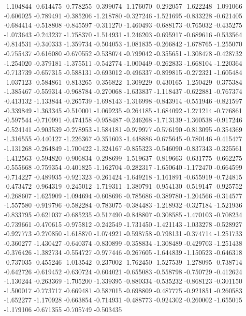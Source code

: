 -1.104844
-0.614475
-0.778255
-0.399074
-1.176070
-0.292057
-1.622248
-1.091066
-0.606025
-0.789491
-0.385206
-1.218780
-0.327246
-1.521695
-0.833228
-0.621405
-0.684414
-0.518808
-0.845597
-0.311270
-1.460493
-0.688173
-0.765032
-0.435275
-1.073643
-0.243237
-1.758370
-1.514931
-1.246203
-0.695917
-0.689616
-0.533564
-0.814531
-0.340333
-1.359734
-0.504053
-1.081835
-0.266842
-1.678765
-1.255070
-0.755437
-0.616080
-0.670552
-0.538074
-0.799042
-0.355651
-1.308478
-0.428732
-1.254020
-0.379181
-1.375511
-0.542774
-1.000449
-0.262833
-1.668104
-1.220364
-0.713739
-0.657315
-0.588131
-0.693012
-0.496337
-0.899815
-0.272321
-1.605484
-1.037123
-0.584861
-0.813265
-0.356822
-1.309229
-0.430165
-1.250429
-0.375384
-1.385467
-0.559314
-0.968784
-0.270068
-1.633837
-1.118437
-0.622881
-0.767374
-0.413132
-1.133844
-0.265739
-1.698143
-1.316998
-0.843914
-0.551946
-0.821597
-0.339849
-1.363345
-0.510001
-1.069235
-0.264185
-1.684092
-1.271214
-0.776861
-0.597544
-0.710991
-0.474158
-0.958487
-0.246268
-1.713139
-1.360538
-0.917246
-0.524141
-0.903539
-0.278953
-1.584181
-0.979977
-0.576190
-0.813095
-0.354369
-1.316555
-0.440127
-1.226367
-0.351603
-1.448886
-0.675645
-0.780146
-0.415477
-1.131268
-0.264849
-1.700422
-1.324167
-0.855323
-0.546090
-0.837343
-0.325561
-1.412563
-0.594820
-0.906834
-0.298699
-1.519637
-0.819663
-0.631775
-0.662275
-0.555668
-0.759354
-0.401825
-1.162704
-0.282317
-1.650640
-1.172470
-0.664599
-0.714227
-0.489935
-0.921323
-0.261424
-1.649218
-1.161891
-0.655919
-0.724815
-0.473472
-0.964319
-0.245012
-1.719311
-1.380791
-0.954130
-0.519147
-0.925752
-0.268607
-1.625909
-1.094694
-0.608696
-0.785686
-0.389780
-1.204566
-0.314577
-1.557580
-0.919796
-0.582284
-0.783075
-0.384483
-1.218932
-0.327184
-1.521936
-0.833795
-0.621037
-0.685235
-0.517490
-0.848807
-0.308585
-1.470103
-0.708234
-0.739661
-0.470615
-0.975812
-0.242549
-1.731450
-1.421143
-1.033278
-0.528927
-0.927773
-0.270850
-1.618870
-1.074921
-0.598758
-0.798131
-0.374714
-1.251733
-0.360277
-1.430427
-0.640374
-0.830899
-0.358834
-1.308489
-0.429703
-1.251438
-0.376426
-1.382734
-0.554727
-0.977446
-0.267605
-1.644839
-1.150523
-0.646318
-0.737035
-0.455246
-1.013542
-0.237002
-1.762450
-1.527539
-1.278095
-0.738714
-0.642726
-0.619452
-0.630724
-0.604021
-0.655083
-0.558798
-0.750729
-0.412624
-1.130244
-0.263369
-1.705200
-1.339395
-0.880334
-0.535232
-0.868123
-0.301150
-1.500017
-0.773717
-0.669481
-0.587015
-0.698809
-0.487775
-0.921851
-0.260583
-1.652277
-1.170928
-0.663854
-0.714931
-0.488773
-0.924302
-0.260002
-1.655015
-1.179106
-0.671355
-0.705749
-0.503435
